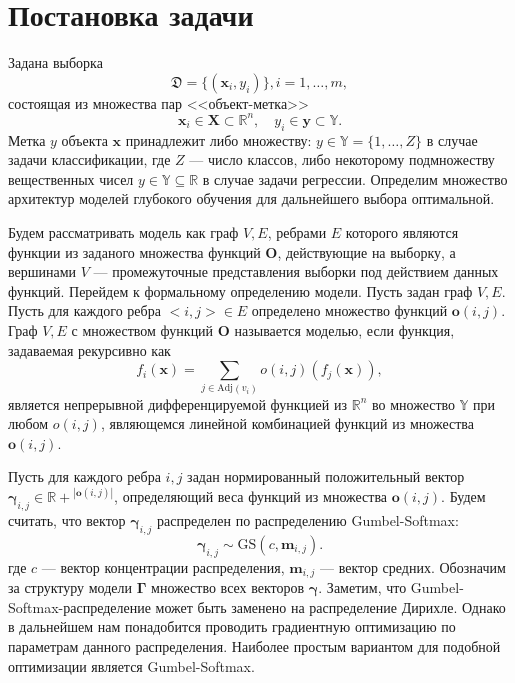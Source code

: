 \documentclass[12pt]{article}
\begin{document}
\section{Постановка задачи}
Задана выборка  \begin{equation}\label{eq:dataset}\mathfrak{D} = \{(\mathbf{x}_i,y_i)\}, i = 1,\dots,m,\end{equation} состоящая из множества пар <<объект-метка>> $$\mathbf{x}_i \in \mathbf{X} \subset \mathbb{R}^n, \quad {y}_i \in \mathbf{y} \subset \mathbb{Y}.$$ Метка ${y}$  объекта $\mathbf{x}$ принадлежит либо множеству: ${y} \in \mathbb{Y} = \{1, \dots, Z\}$ в случае задачи классификации, где $Z$ --- число классов, либо некоторому подмножеству вещественных чисел ${y} \in \mathbb{Y}  \subseteq \mathbb{R}$ в случае задачи регрессии. Определим множество архитектур моделей глубокого обучения для дальнейшего выбора оптимальной. 

Будем рассматривать модель как граф $V,E$, ребрами $E$ которого являются функции из заданого множества функций $\mathbf{O}$, действующие на выборку, а вершинами $V$ --- промежуточные представления выборки под действием данных функций. Перейдем к формальному определению модели.
Пусть задан граф $V,E$. Пусть для каждого ребра $<i,j> \in E$ определено множество функций $\mathbf{o}(i,j)$. Граф $V, E$ с множеством функций $\mathbf{O}$ называется моделью, если функция, задаваемая рекурсивно как 
\[
    f_i(\mathbf{x}) = \sum_{j \in \text{Adj}(v_i)} o(i,j) (f_{j}(\mathbf{x})), 
\]
является непрерывной дифференцируемой функцией из $\mathbb{R}^n$ во множество $\mathbb{Y}$ при любом $o(i,j)$, являющемся линейной комбинацией функций из множества $\mathbf{o}(i,j)$.

Пусть для каждого ребра $i,j$ задан нормированный положительный вектор $\boldsymbol{\gamma}_{i,j} \in \mathbb{R+}^{|\mathbf{o}(i,j)|}$, определяющий веса функций из множества $\mathbf{o}(i,j)$.
Будем считать, что вектор $\boldsymbol{\gamma}_{i,j}$ распределен по распределению Gumbel-Softmax:
\[
    \boldsymbol{\gamma}_{i,j}  \sim \text{GS}({c}, \mathbf{m}_{i,j}).
\] 
где $c$ --- вектор концентрации распределения, $\mathbf{m}_{i,j}$ --- вектор средних. Обозначим за структуру модели $\boldsymbol{\Gamma}$ множество всех векторов $\boldsymbol{\gamma}$.
Заметим, что Gumbel-Softmax-распределение может быть заменено на распределение Дирихле. Однако в дальнейшем нам понадобится проводить градиентную оптимизацию по параметрам данного распределения. Наиболее простым вариантом для подобной оптимизации является Gumbel-Softmax.
\end{document}
